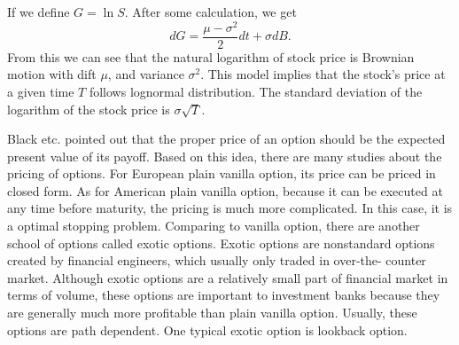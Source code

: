 \documentclass[11pt]{book}
\begin{document}
If we define $G = \ln S$. After some calculation, we get 
\begin{equation}\label{eq:2}
dG = \frac{\mu - \sigma ^2 }{2} dt + \sigma dB.
\end{equation}
From this we can see that the natural logarithm of stock price is Brownian motion with dift $\mu$, and variance $\sigma^2$. This model implies that the stock's price at a given time $T$ follows lognormal distribution. The standard deviation of the logarithm of the stock price is $\sigma \sqrt{T}$. 

Black etc. \cite{Black:1973} pointed out that the proper price of an option should be the expected present value of its payoff. Based on this idea, there are many studies about the pricing of options. For European plain vanilla option, its price can be priced in closed form. As for American plain vanilla option, because it can be executed at any time before maturity, the pricing is much more complicated. In this case, it is a optimal stopping problem. Comparing to vanilla option, there are another school of options called exotic options. Exotic options are nonstandard options created by financial engineers, which usually only traded in over-the- counter market. Although exotic options are a relatively small part of financial market in terms of volume, these options are important to investment banks because they are generally much more profitable than plain vanilla option. Usually, these options are path dependent. One typical exotic option is lookback option.

\end{document}
